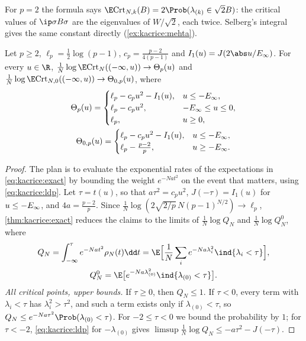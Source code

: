 \begin{refsection}
For $p=2$ the formula says $\E\kacriceCrt_{N,k}(B)=2\Prob(\lambda_{(k)}\in\sqrt2B)$: the critical values of $\ip\sigma{B\sigma}$ are the eigenvalues of $W/\sqrt2$, each twice. Selberg's integral gives the same constant directly (\cref{ex:kacrice:mehta}).

\begin{theorem}\label{thm:kacrice:annealed}
Let $p\ge2$, $\ell_p=\frac12\log(p-1)$, $c_p=\frac{p-2}{4(p-1)}$ and $I_1(u)=J(2\abs u/\kacriceinf)$. For every $u\in\R$, $\frac1N\log\E\kacriceCrt_N((-\infty,u))\to\Theta_p(u)$ and $\frac1N\log\E\kacriceCrt_{N,0}((-\infty,u))\to\Theta_{0,p}(u)$, where
\begin{gather*}
\Theta_p(u)=\begin{cases}\ell_p-c_pu^2-I_1(u),&u\le-E_\infty,\\\ell_p-c_pu^2,&-E_\infty\le u\le0,\\\ell_p,&u\ge0,\end{cases}\\
\Theta_{0,p}(u)=\begin{cases}\ell_p-c_pu^2-I_1(u),&u\le-E_\infty,\\\ell_p-\frac{p-2}p,&u\ge-E_\infty.\end{cases}
\end{gather*}
\end{theorem}

\begin{proof}
The plan is to evaluate the exponential rates of the expectations in \eqref{eq:kacrice:exact} by bounding the weight $e^{-Nat^2}$ on the event that matters, using \eqref{eq:kacrice:ldp}. Let $\tau=t(u)$, so that $a\tau^2=c_pu^2$, $J(-\tau)=I_1(u)$ for $u\le-E_\infty$, and $4a=\frac{p-2}p$. Since $\frac1N\log(2\sqrt{2/p}\,N(p-1)^{N/2})\to\ell_p$, \cref{thm:kacrice:exact} reduces the claims to the limits of $\frac1N\log Q_N$ and $\frac1N\log Q^0_N$, where
\begin{gather*}
Q_N=\int_{-\infty}^\tau e^{-Nat^2}\rho_N(t)\dd t=\E\Bigl[\frac1N\sum_ie^{-Na\lambda_i^2}\ind\{\lambda_i<\tau\}\Bigr],\\
Q^0_N=\E\bigl[e^{-Na\lambda_{(0)}^2}\ind\{\lambda_{(0)}<\tau\}\bigr].
\end{gather*}
\emph{All critical points, upper bounds.} If $\tau\ge0$, then $Q_N\le1$. If $\tau<0$, every term with $\lambda_i<\tau$ has $\lambda_i^2>\tau^2$, and such a term exists only if $\lambda_{(0)}<\tau$, so $Q_N\le e^{-Na\tau^2}\Prob(\lambda_{(0)}<\tau)$. For $-2\le\tau<0$ we bound the probability by $1$; for $\tau<-2$, \eqref{eq:kacrice:ldp} for $-\lambda_{(0)}$ gives $\limsup\frac1N\log Q_N\le-a\tau^2-J(-\tau)$.


\end{proof}
\end{refsection}
